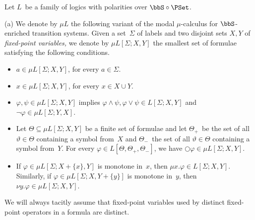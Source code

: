 \documentclass[10pt, fleqn]{scrartcl}
\newcommand*{\?}{\kern .08em}
\newcommand\medcircle{\bigcirc}
\begin{document}
\begin{Def}
Let $L$~be a family of logics with polarities over $\bbS \circ \PSet$.

(a) We denote by $\mu L$ the following variant of the modal $\mu$-calculus for
$\bbS$-enriched transition systems.
Given a set~$\Sigma$ of labels and two disjoint sets $X,Y$ of \emph{fixed-point variables,}
we denote by $\mu L[\Sigma;X,Y]$ the smallest set of formulae satisfying the following
conditions.
\begin{itemize}
\item $a \in \mu L[\Sigma;X,Y]$, for every $a \in \Sigma$.
\item $x \in \mu L[\Sigma;X,Y]$, for every $x \in X \cup Y$.
\item $\varphi,\psi \in \mu L[\Sigma;X,Y]$ implies
  $\varphi \land \psi, \varphi \lor \psi \in L[\Sigma;X,Y]$ and
  $\neg\varphi \in \mu L[\Sigma;Y,X]$.
\item Let $\Theta \subseteq \mu L[\Sigma;X,Y]$ be a finite set of formulae
  and let $\Theta_+$~be the set of all $\vartheta \in \Theta$ containing a symbol from~$X$ and
  $\Theta_-$~the set of all $\vartheta \in \Theta$ containing a symbol from~$Y$.
  For every $\varphi \in L[\Theta,\Theta_+,\Theta_-]$, we have
  ${\medcircle}\varphi \in \mu L[\Sigma;X,Y]$.
\item If $\varphi \in \mu L[\Sigma;X + \{x\},Y]$ is monotone in~$x$,
  then $\mu x.\varphi \in L[\Sigma;X,Y]$.
  Similarly, if $\varphi \in \mu L[\Sigma;X,Y + \{y\}]$ is monotone in~$y$,
  then $\nu y.\varphi \in \mu L[\Sigma;X,Y]$.
\end{itemize}
We will always tacitly assume that fixed-point variables used by distinct
fixed-point operators in a formula are distinct.


\end{Def}
\end{document}
